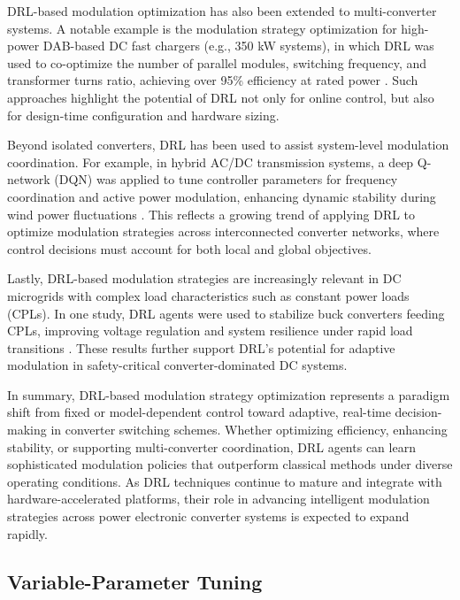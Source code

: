 DRL-based modulation optimization has also been extended to multi-converter systems. A notable example is the modulation strategy optimization for high-power DAB-based DC fast chargers (e.g., 350 kW systems), in which DRL was used to co-optimize the number of parallel modules, switching frequency, and transformer turns ratio, achieving over 95\% efficiency at rated power \cite{tang2020reinforcement}. Such approaches highlight the potential of DRL not only for online control, but also for design-time configuration and hardware sizing.

Beyond isolated converters, DRL has been used to assist system-level modulation coordination. For example, in hybrid AC/DC transmission systems, a deep Q-network (DQN) was applied to tune controller parameters for frequency coordination and active power modulation, enhancing dynamic stability during wind power fluctuations \cite{hui2024frequency}. This reflects a growing trend of applying DRL to optimize modulation strategies across interconnected converter networks, where control decisions must account for both local and global objectives.

Lastly, DRL-based modulation strategies are increasingly relevant in DC microgrids with complex load characteristics such as constant power loads (CPLs). In one study, DRL agents were used to stabilize buck converters feeding CPLs, improving voltage regulation and system resilience under rapid load transitions \cite{muhammad2025performance}. These results further support DRL's potential for adaptive modulation in safety-critical converter-dominated DC systems.

In summary, DRL-based modulation strategy optimization represents a paradigm shift from fixed or model-dependent control toward adaptive, real-time decision-making in converter switching schemes. Whether optimizing efficiency, enhancing stability, or supporting multi-converter coordination, DRL agents can learn sophisticated modulation policies that outperform classical methods under diverse operating conditions. As DRL techniques continue to mature and integrate with hardware-accelerated platforms, their role in advancing intelligent modulation strategies across power electronic converter systems is expected to expand rapidly.

\subsection{Variable-Parameter Tuning}
\label{sec:ctrl_vartuning}

